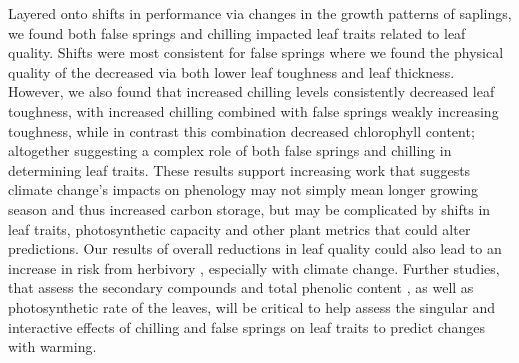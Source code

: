 \documentclass{article}\usepackage[]{graphicx}\usepackage[]{color}
\begin{document}
\begin{enumerate}
Layered onto shifts in performance via changes in the growth patterns of saplings, we found both false springs and chilling impacted leaf traits related to leaf quality. Shifts were most consistent for false springs where we found the physical quality of the decreased via both lower leaf toughness and leaf thickness. However, we also found that increased chilling levels consistently decreased leaf toughness, with increased chilling combined with false springs weakly increasing toughness, while in contrast this combination decreased chlorophyll content; altogether suggesting a complex role of both false springs and chilling in determining leaf traits. These results support increasing work that suggests climate change's impacts on phenology may not simply mean longer growing season and thus increased carbon storage, but may be complicated by shifts in leaf traits, photosynthetic capacity and other plant metrics \citep{Bauerle2012,Huang2020,Stinziano2017,Zani2020} that could alter predictions. Our results of overall reductions in leaf quality could also lead to an increase in risk from herbivory \citep{Onoda2011}, especially with climate change. Further studies, that assess the secondary compounds and total phenolic content \citep{Ayres1993, Webber2016}, as well as photosynthetic rate of the leaves, will be critical to help assess the singular and interactive effects of chilling and false springs on leaf traits to predict changes with warming. 


\end{enumerate}
\end{document}
